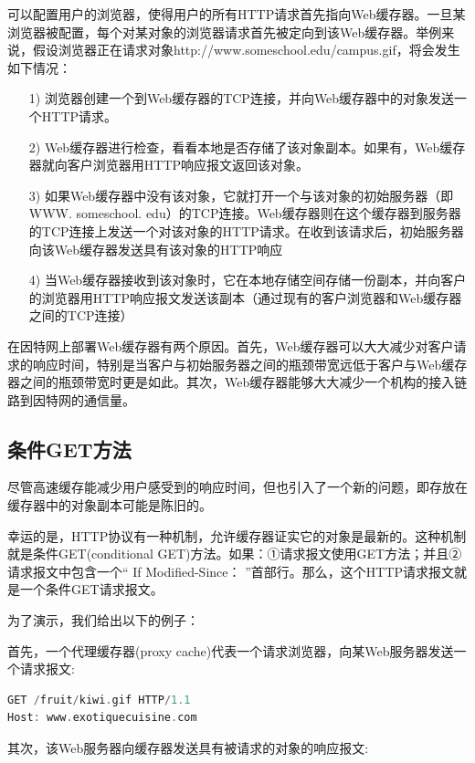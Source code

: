     可以配置用户的浏览器，使得用户的所有HTTP请求首先指向Web缓存器。一旦某浏览器被配置，每个对某对象的浏览器请求首先被定向到该Web缓存器。举例来说，假设浏览器正在请求对象http://www.someschool.edu/campus.gif，将会发生如下情况：

\begin{itemize}
    \item [1)] 浏览器创建一个到Web缓存器的TCP连接，并向Web缓存器中的对象发送一个HTTP请求。
    \item [2)] Web缓存器进行检查，看看本地是否存储了该对象副本。如果有，Web缓存器就向客户浏览器用HTTP响应报文返回该对象。
    \item [3)] 如果Web缓存器中没有该对象，它就打开一个与该对象的初始服务器（即WWW. someschool. edu）的TCP连接。Web缓存器则在这个缓存器到服务器的TCP连接上发送一个对该对象的HTTP请求。在收到该请求后，初始服务器向该Web缓存器发送具有该对象的HTTP响应
    \item [4)] 当Web缓存器接收到该对象时，它在本地存储空间存储一份副本，并向客户的浏览器用HTTP响应报文发送该副本（通过现有的客户浏览器和Web缓存器之间的TCP连接）
\end{itemize}

    在因特网上部署Web缓存器有两个原因。首先，Web缓存器可以大大减少对客户请求的响应时间，特别是当客户与初始服务器之间的瓶颈带宽远低于客户与Web缓存器之间的瓶颈带宽时更是如此。其次，Web缓存器能够大大减少一个机构的接入链路到因特网的通信量。

\subsection{条件GET方法}

    尽管高速缓存能减少用户感受到的响应时间，但也引入了一个新的问题，即存放在缓存器中的对象副本可能是陈旧的。

    幸运的是，HTTP协议有一种机制，允许缓存器证实它的对象是最新的。这种机制就是条件GET(conditional GET)方法。如果：①请求报文使用GET方法；并且②请求报文中包含一个“ If Modified-Since： ”首部行。那么，这个HTTP请求报文就是一个条件GET请求报文。

    为了演示，我们给出以下的例子：

    首先，一个代理缓存器(proxy cache)代表一个请求浏览器，向某Web服务器发送一个请求报文:

\begin{lstlisting}[language=C++]
GET /fruit/kiwi.gif HTTP/1.1
Host: www.exotiquecuisine.com
\end{lstlisting}

    其次，该Web服务器向缓存器发送具有被请求的对象的响应报文:

